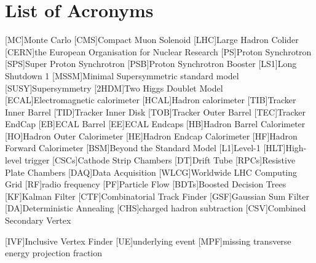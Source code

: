 




\chapter*{List of Acronyms}
\begin{acronym}[CERN]
[MC]{Monte Carlo}
[CMS]{Compact Muon Solenoid}
[LHC]{Large Hadron Colider}
[CERN]{the European Organisation for Nuclear Research }
[PS]{Proton Synchrotron}
[SPS]{Super Proton Synchrotron}
[PSB]{Proton Synchrotron Booster}
[LS1]{Long Shutdown 1}
[MSSM]{Minimal Supersymmetric standard model}
[SUSY]{Supersymmetry}
[2HDM]{Two Higgs Doublet Model}
[ECAL]{Electromagnetic calorimeter}
[HCAL]{Hadron calorimeter}
[TIB]{Tracker Inner Barrel}
[TID]{Tracker Inner Disk}
[TOB]{Tracker Outer Barrel}
[TEC]{Tracker EndCap}
[EB]{ECAL Barrel}
[EE]{ECAL Endcaps}
[HB]{Hadron Barrel Calorimeter}
[HO]{Hadron Outer Calorimeter}
[HE]{Hadron Endcap Calorimeter}
[HF]{Hadron Forward Calorimeter}
[BSM]{Beyond the Standard Model}
[L1]{Level-1}
[HLT]{High-level trigger}
[CSCs]{Cathode Strip Chambers}
[DT]{Drift Tube}
[RPCs]{Resistive Plate Chambers}
[DAQ]{Data Acquisition}
[WLCG]{Worldwide LHC Computing Grid}
[RF]{radio frequency}
[PF]{Particle Flow}
[BDTs]{Boosted Decision Trees}
[KF]{Kalman Filter}
[CTF]{Combinatorial Track Finder}
[GSF]{Gaussian Sum Filter}
[DA]{Deterministic Annealing}
[CHS]{charged hadron subtraction}
[CSV]{Combined Secondary Vertex}

[IVF]{Inclusive Vertex Finder}
[UE]{underlying event}
[MPF]{missing transverse energy projection fraction}
\end{acronym}

